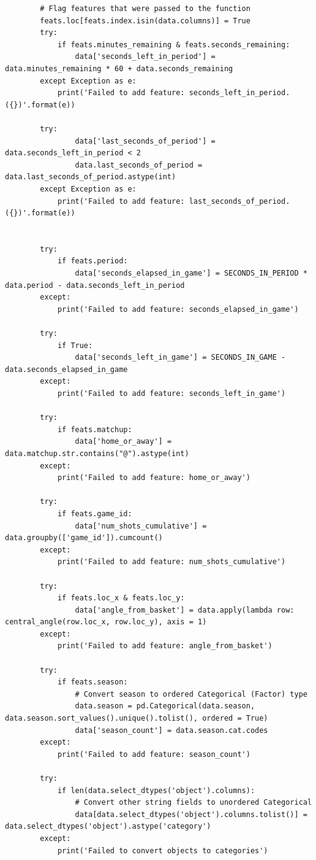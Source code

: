 \begin{verbatim}
        # Flag features that were passed to the function
        feats.loc[feats.index.isin(data.columns)] = True
        try:
            if feats.minutes_remaining & feats.seconds_remaining:
                data['seconds_left_in_period'] = data.minutes_remaining * 60 + data.seconds_remaining
        except Exception as e:
            print('Failed to add feature: seconds_left_in_period. ({})'.format(e))

        try:
                data['last_seconds_of_period'] = data.seconds_left_in_period < 2
                data.last_seconds_of_period = data.last_seconds_of_period.astype(int)
        except Exception as e:
            print('Failed to add feature: last_seconds_of_period. ({})'.format(e))


        try:
            if feats.period:
                data['seconds_elapsed_in_game'] = SECONDS_IN_PERIOD * data.period - data.seconds_left_in_period
        except:
            print('Failed to add feature: seconds_elapsed_in_game')

        try:
            if True:
                data['seconds_left_in_game'] = SECONDS_IN_GAME - data.seconds_elapsed_in_game
        except:
            print('Failed to add feature: seconds_left_in_game')

        try:
            if feats.matchup:
                data['home_or_away'] = data.matchup.str.contains("@").astype(int)
        except:
            print('Failed to add feature: home_or_away')

        try:
            if feats.game_id:
                data['num_shots_cumulative'] = data.groupby(['game_id']).cumcount()
        except:
            print('Failed to add feature: num_shots_cumulative')

        try:
            if feats.loc_x & feats.loc_y:
                data['angle_from_basket'] = data.apply(lambda row: central_angle(row.loc_x, row.loc_y), axis = 1)
        except:
            print('Failed to add feature: angle_from_basket')

        try:
            if feats.season:
                # Convert season to ordered Categorical (Factor) type
                data.season = pd.Categorical(data.season, data.season.sort_values().unique().tolist(), ordered = True)
                data['season_count'] = data.season.cat.codes
        except:
            print('Failed to add feature: season_count')

        try:
            if len(data.select_dtypes('object').columns):
                # Convert other string fields to unordered Categorical
                data[data.select_dtypes('object').columns.tolist()] = data.select_dtypes('object').astype('category')
        except:
            print('Failed to convert objects to categories')


\end{verbatim}
